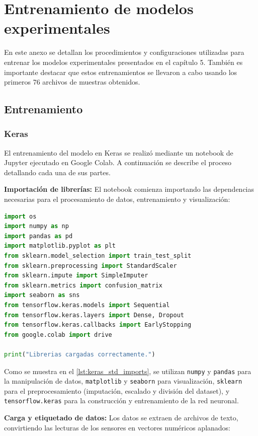 \chapter{Entrenamiento de modelos experimentales}
En este anexo se detallan los procedimientos y configuraciones utilizadas para entrenar los modelos experimentales presentados en el capítulo 5. También es importante destacar que estos entrenamientos se llevaron a cabo usando los primeros 76 archivos de muestras obtenidos.

\section{Entrenamiento}

\subsection{Keras}
El entrenamiento del modelo en Keras se realizó mediante un notebook de Jupyter ejecutado en Google Colab. A continuación se describe el proceso detallando cada una de sus partes.

\textbf{Importación de librerías:} El notebook comienza importando las dependencias necesarias para el procesamiento de datos, entrenamiento y visualización:

\begin{lstlisting}[language=Python, caption={Importación de librerías para el entrenamiento en Keras.}, label={lst:keras_std_imports}]
import os
import numpy as np
import pandas as pd
import matplotlib.pyplot as plt
from sklearn.model_selection import train_test_split
from sklearn.preprocessing import StandardScaler
from sklearn.impute import SimpleImputer
from sklearn.metrics import confusion_matrix
import seaborn as sns
from tensorflow.keras.models import Sequential
from tensorflow.keras.layers import Dense, Dropout
from tensorflow.keras.callbacks import EarlyStopping
from google.colab import drive

print("Librerias cargadas correctamente.")
\end{lstlisting}

Como se muestra en el \autoref{lst:keras_std_imports}, se utilizan \texttt{numpy} y \texttt{pandas} para la manipulación de datos, \texttt{matplotlib} y \texttt{seaborn} para visualización, \texttt{sklearn} para el preprocesamiento (imputación, escalado y división del dataset), y \texttt{tensorflow.keras} para la construcción y entrenamiento de la red neuronal.

\textbf{Carga y etiquetado de datos:} Los datos se extraen de archivos de texto, convirtiendo las lecturas de los sensores en vectores numéricos aplanados:

